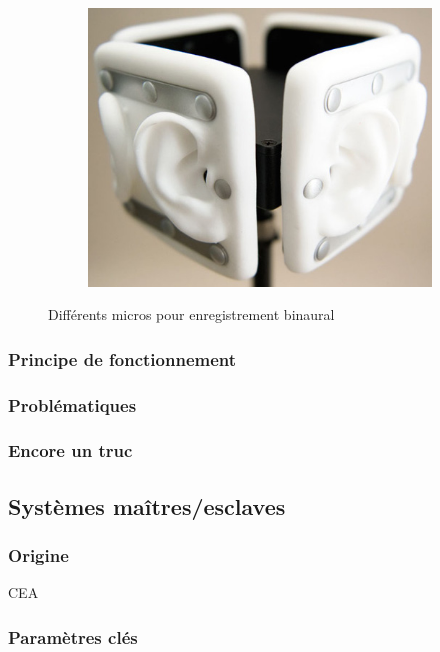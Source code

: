 \documentclass[a4,12pt]{scrartcl}
\begin{document}
\begin{figure}[H]
\begin{subfigure}{.3\linewidth}
	\end{subfigure}
 	~
	\begin{subfigure}{.3\linewidth}
	  \centering
	  \includegraphics[width=\linewidth]{freespace-omni}
	\end{subfigure}
 	\caption{Différents micros pour enregistrement binaural}
\end{figure}

\subsubsection{Principe de fonctionnement}
\subsubsection{Problématiques}
\subsubsection{Encore un truc}

\subsection{Systèmes maîtres/esclaves}

\subsubsection{Origine}

CEA

\subsubsection{Paramètres clés}
\end{document}
